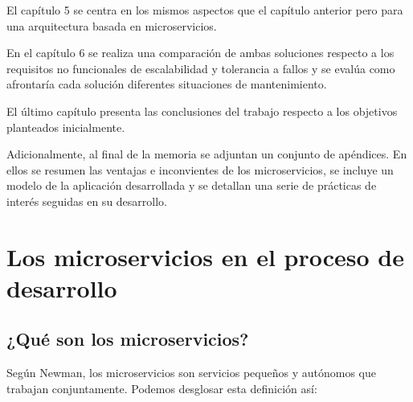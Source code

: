 \documentclass[11pt,spanish,listoffigures]{tfgetsinf}
\begin{document}
El capítulo 5 se centra en los mismos aspectos que el capítulo anterior pero para una arquitectura basada en microservicios.

En el capítulo 6 se realiza una comparación de ambas soluciones respecto a los requisitos no funcionales de escalabilidad y tolerancia a fallos  y se evalúa como afrontaría cada solución diferentes situaciones de mantenimiento.

El último capítulo presenta las conclusiones del trabajo respecto a los objetivos planteados inicialmente.

Adicionalmente, al final de la memoria se adjuntan un conjunto de apéndices. En ellos se resumen las ventajas e inconvientes de los microservicios, se incluye un modelo de la aplicación desarrollada y se detallan una serie de prácticas de interés seguidas en su desarrollo.

%

\chapter{Los microservicios en el proceso de desarrollo}

\section{¿Qué son los microservicios?}

Según Newman, los microservicios son servicios pequeños y autónomos que trabajan conjuntamente. \cite{Newman2015a} Podemos desglosar esta definición así:
\end{document}
